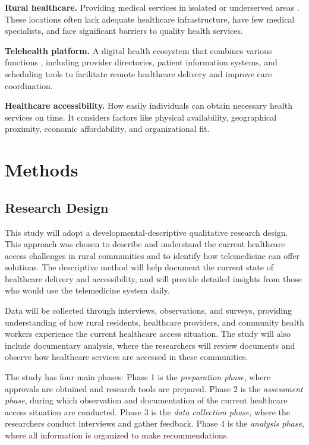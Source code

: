 \documentclass[12pt]{report}
\begin{document}
\noindent\textbf{Rural healthcare.} Providing medical services in isolated or underserved
areas \cite{ref47}. These locations often lack adequate healthcare
infrastructure, have few medical specialists, and face significant barriers to
quality health services.

\noindent\textbf{Telehealth platform.} A digital health ecosystem that combines various
functions \cite{ref61}, including provider directories, patient information
systems, and scheduling tools to facilitate remote healthcare delivery and
improve care coordination.

\noindent\textbf{Healthcare accessibility.} How easily individuals can obtain necessary
health services on time. It considers factors like physical availability,
geographical proximity, economic affordability, and organizational fit.

\clearpage

\chapter{Methods}

\section*{Research Design}

This study will adopt a developmental-descriptive qualitative research design.
This approach was chosen to describe and understand the current healthcare
access challenges in rural communities and to identify how telemedicine can
offer solutions. The descriptive method will help document the current state of
healthcare delivery and accessibility, and will provide detailed insights from
those who would use the telemedicine system daily.

Data will be collected through interviews, observations, and surveys, providing
understanding of how rural residents, healthcare providers, and community health
workers experience the current healthcare access situation. The study will also
include documentary analysis, where the researchers will review documents and
observe how healthcare services are accessed in these communities.

The study has four main phases: Phase 1 is the \textit{preparation phase},
where approvals are obtained and research tools are prepared. Phase 2 is the
\textit{assessment phase}, during which observation and documentation of the
current healthcare access situation are conducted. Phase 3 is the \textit{data
collection phase}, where the researchers conduct interviews and gather feedback.
Phase 4 is the \textit{analysis phase}, where all information is organized to
make recommendations.
\end{document}
